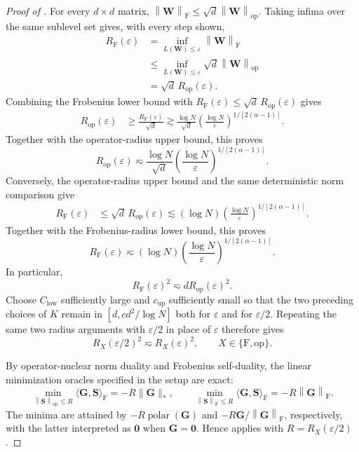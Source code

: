 \documentclass[11pt]{article}
\theoremstyle{definition}
\newcommand{\Gb}{\mathbf{G}}
\newcommand{\Sb}{\mathbf{S}}
\newcommand{\Wb}{\mathbf{W}}
\newcommand{\eps}{\varepsilon}
\newcommand{\normF}[1]{\left\lVert #1\right\rVert_{\mathrm F}}
\newcommand{\normop}[1]{\left\lVert #1\right\rVert_{\mathrm{op}}}
\DeclareMathOperator{\polar}{polar}
\begin{document}
\begin{proof}[Proof of ]
For every $d\times d$ matrix,
$\normF{\Wb}\leq\sqrt d\normop{\Wb}$.  Taking infima over the same
sublevel set gives, with every step shown,
\begin{align*}
 R_{\mathrm F}(\eps)
 &=\inf_{L(\Wb)\leq\eps}\normF{\Wb}\\
 &\leq\inf_{L(\Wb)\leq\eps}\sqrt d\normop{\Wb}\\
 &=\sqrt d\,R_{\mathrm{op}}(\eps).
\end{align*}
Combining the Frobenius lower bound with
$R_{\mathrm F}(\eps)\leq\sqrt d\,R_{\mathrm{op}}(\eps)$ gives
\begin{align*}
 R_{\mathrm{op}}(\eps)
 &\geq\frac{R_{\mathrm F}(\eps)}{\sqrt d}\gtrsim
 \frac{\log N}{\sqrt d}
 \left(\frac{\log N}{\eps}\right)^{1/[2(\alpha-1)]}.
\end{align*}
Together with the operator-radius upper bound, this proves
\[
 R_{\mathrm{op}}(\eps)
 \eqsim
 \frac{\log N}{\sqrt d}
 \left(\frac{\log N}{\eps}\right)^{1/[2(\alpha-1)]}.
\]
Conversely, the operator-radius upper bound and the same deterministic norm
comparison give
\begin{align*}
 R_{\mathrm F}(\eps)
 &\leq\sqrt d\,R_{\mathrm{op}}(\eps)\lesssim
 (\log N)
 \left(\frac{\log N}{\eps}\right)^{1/[2(\alpha-1)]}.
\end{align*}
Together with the Frobenius-radius lower bound, this proves
\[
 R_{\mathrm F}(\eps)
 \eqsim
 (\log N)
 \left(\frac{\log N}{\eps}\right)^{1/[2(\alpha-1)]}.
\]
In particular,
\[
 R_{\mathrm F}(\eps)^2\eqsim dR_{\mathrm{op}}(\eps)^2.
\]
Choose $C_{\mathrm{low}}$ sufficiently large and
$c_{\mathrm{up}}$ sufficiently small so that the two preceding choices of
$K$ remain in $[d,c d^2/\log N]$ both for $\eps$ and for $\eps/2$.
Repeating the same two radius arguments with $\eps/2$ in place of $\eps$
therefore gives
\[
 R_X(\eps/2)^2\eqsim R_X(\eps)^2,
 \qquad X\in\{\mathrm F,\mathrm{op}\}.
\]

By operator-nuclear norm duality and Frobenius self-duality,
the linear minimization oracles specified in the setup are exact:
\[
 \min_{\normop{\Sb}\le R}\langle \Gb,\Sb\rangle_{\mathrm F}
 =-R\|\Gb\|_*,
 \qquad
 \min_{\normF{\Sb}\le R}\langle \Gb,\Sb\rangle_{\mathrm F}
 =-R\normF{\Gb}.
\]
The minima are attained by
$-R\polar(\Gb)$ and
$-R\Gb/\normF{\Gb}$, respectively, with the latter interpreted as
$\mathbf 0$ when $\Gb=\mathbf 0$.
Hence  applies with $R=R_X(\eps/2)$.



\end{proof}
\end{document}

